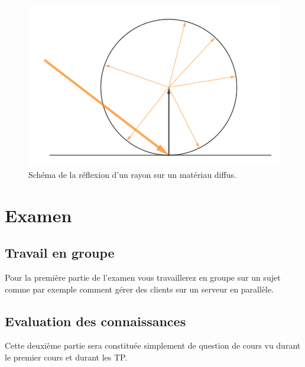 \documentclass[french,12pt]{article}
\begin{document}
\begin{figure}[h]
	\centering
	\includegraphics[scale=0.5]{figures/diffuse.png}
	\caption{Schéma de la réflexion d'un rayon sur un matériau diffus.}
\end{figure}

\section{Examen}
\subsection{Travail en groupe}
Pour la première partie de l'examen vous travaillerez en groupe sur un sujet comme par exemple comment gérer des clients sur un serveur en parallèle.
\subsection{Evaluation des connaissances}
Cette deuxième partie sera constituée simplement de question de cours vu durant le premier cours et durant les TP.
\end{document}
